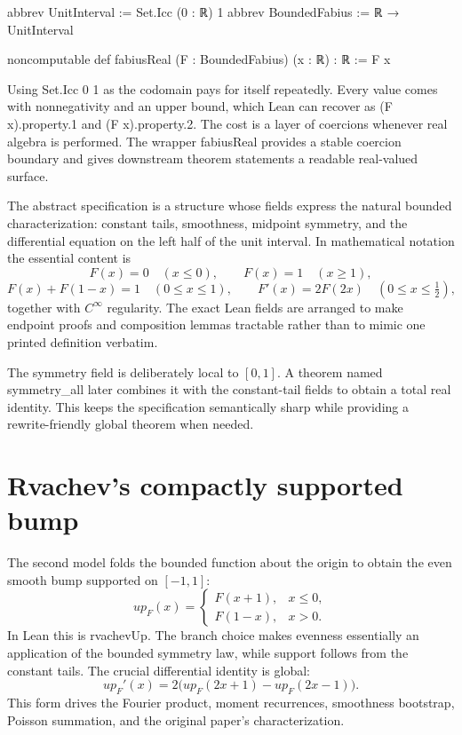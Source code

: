 \documentclass[11pt,a4paper,openany]{book}
\def\decl#1{#1}
\def\code#1{#1}
\def\upfun{up}
\newcommand{\upfun}{\ensuremath{\operatorname{up}}}
\newcommand{\decl}[1]{\texttt{\detokenize{#1}}}
\newcommand{\code}[1]{\texttt{\detokenize{#1}}}
\begin{document}
\begin{LeanCode}
abbrev UnitInterval := Set.Icc (0 : ℝ) 1
abbrev BoundedFabius := ℝ → UnitInterval

noncomputable def fabiusReal (F : BoundedFabius) (x : ℝ) : ℝ := F x
\end{LeanCode}

Using \code{Set.Icc 0 1} as the codomain pays for itself repeatedly.  Every
value comes with nonnegativity and an upper bound, which Lean can recover as
\code{(F x).property.1} and \code{(F x).property.2}.  The cost is a layer of
coercions whenever real algebra is performed.  The wrapper \decl{fabiusReal}
provides a stable coercion boundary and gives downstream theorem statements a
readable real-valued surface.

The abstract specification is a structure whose fields express the natural
bounded characterization: constant tails, smoothness, midpoint symmetry, and
the differential equation on the left half of the unit interval.  In
mathematical notation the essential content is
\[
 F(x)=0\quad(x\le 0),\qquad F(x)=1\quad(x\ge 1),
\]
\[
 F(x)+F(1-x)=1\quad(0\le x\le1),
 \qquad F'(x)=2F(2x)\quad(0\le x\le \tfrac12),
\]
together with $C^\infty$ regularity.  The exact Lean fields are arranged to
make endpoint proofs and composition lemmas tractable rather than to mimic one
printed definition verbatim.

\begin{proofidea}
The symmetry field is deliberately local to $[0,1]$.  A theorem named
\decl{symmetry_all} later combines it with the constant-tail fields to obtain a
total real identity.  This keeps the specification semantically sharp while
providing a rewrite-friendly global theorem when needed.
\end{proofidea}

\section{Rvachev's compactly supported bump}
The second model folds the bounded function about the origin to obtain the even
smooth bump supported on $[-1,1]$:
\[
 \upfun_F(x)=
 \begin{cases}
   F(x+1),&x\le0,\\
   F(1-x),&x>0.
 \end{cases}
\]
In Lean this is \decl{rvachevUp}.  The branch choice makes evenness essentially
an application of the bounded symmetry law, while support follows from the
constant tails.  The crucial differential identity is global:
\[
 \upfun_F'(x)=2\bigl(\upfun_F(2x+1)-\upfun_F(2x-1)\bigr).
\]
This form drives the Fourier product, moment recurrences, smoothness bootstrap,
Poisson summation, and the original paper's characterization.
\end{document}
